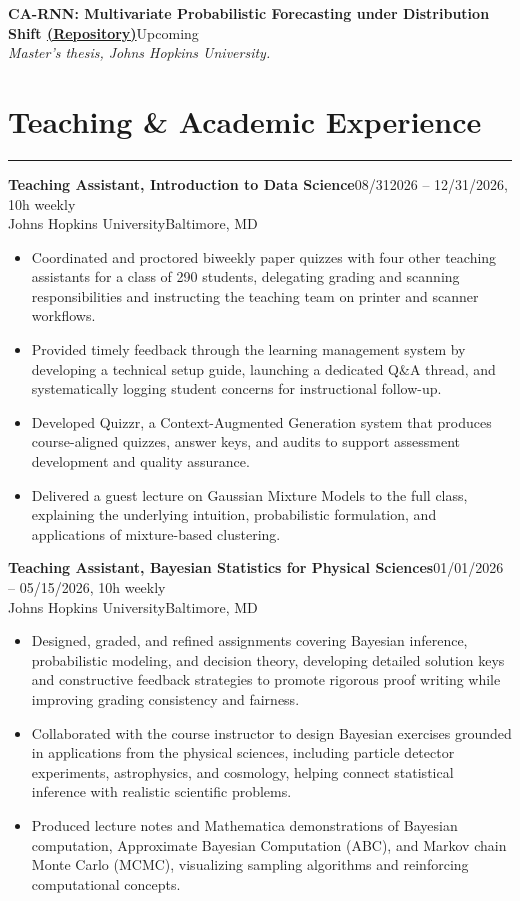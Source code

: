 \documentclass[11pt]{article}
\newcommand{\resheading}[1]{%
  \Needspace{6\baselineskip}%
  \section*{#1}\vspace{-4pt}\color{rulegray}\hrule\vspace{4pt}\color{black}
}
\newcommand{\workentry}[4]{%
  \Needspace{7\baselineskip}%
  \textbf{#1}\hfill #2\\[-1pt]%
  #3\hfill #4\\[-8pt]%
}
\newcommand{\pubentry}[3]{%
  \Needspace{7\baselineskip}%
  \textbf{#1}\hfill #2\\[-1pt]%
  \textit{#3}\\[-8pt]%
}
\newenvironment{tightitemize}{%
  \vspace{-2pt}%
  \begin{itemize}[leftmargin=*,topsep=0pt,itemsep=1pt,parsep=0pt,partopsep=0pt]
}{%
  \end{itemize}\vspace{4pt}
}
\begin{document}
\pubentry
{CA-RNN: Multivariate Probabilistic Forecasting under Distribution Shift \href{https://github.com/JonathanMa03/innovative-droBVAR}{(Repository)}}
{Upcoming}
{Master's thesis, Johns Hopkins University.}


\resheading{Teaching \& Academic Experience}

\workentry
{Teaching Assistant, Introduction to Data Science}
{08/312026 -- 12/31/2026, 10h weekly}
{Johns Hopkins University}
{Baltimore, MD}
\begin{tightitemize}
\item Coordinated and proctored biweekly paper quizzes with four other teaching assistants for a class of 290 students, delegating grading and scanning responsibilities and instructing the teaching team on printer and scanner workflows.
\item Provided timely feedback through the learning management system by developing a technical setup guide, launching a dedicated Q\&A thread, and systematically logging student concerns for instructional follow-up.
\item Developed Quizzr, a Context-Augmented Generation system that produces course-aligned quizzes, answer keys, and audits to support assessment development and quality assurance.
\item Delivered a guest lecture on Gaussian Mixture Models to the full class, explaining the underlying intuition, probabilistic formulation, and applications of mixture-based clustering.
\end{tightitemize}

\workentry
{Teaching Assistant, Bayesian Statistics for Physical Sciences}
{01/01/2026 -- 05/15/2026, 10h weekly}
{Johns Hopkins University}
{Baltimore, MD}
\begin{tightitemize}
\item Designed, graded, and refined assignments covering Bayesian inference, probabilistic modeling, and decision theory, developing detailed solution keys and constructive feedback strategies to promote rigorous proof writing while improving grading consistency and fairness.
\item Collaborated with the course instructor to design Bayesian exercises grounded in applications from the physical sciences, including particle detector experiments, astrophysics, and cosmology, helping connect statistical inference with realistic scientific problems.
\item Produced lecture notes and Mathematica demonstrations of Bayesian computation, Approximate Bayesian Computation (ABC), and Markov chain Monte Carlo (MCMC), visualizing sampling algorithms and reinforcing computational concepts.
\end{tightitemize}
\end{document}
